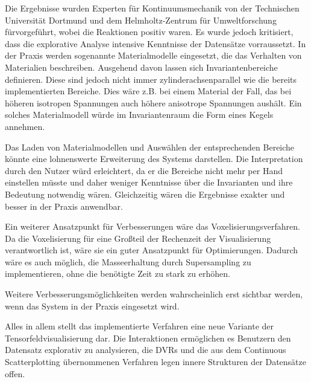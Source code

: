 \documentclass[a4paper,fontsize=12pt,toc=bib,halfparskip]{scrartcl}
\begin{document}
Die Ergebnisse wurden Experten f\"ur Kontinuumsmechanik von der Technischen Universit\"at Dortmund und dem Helmholtz-Zentrum f\"ur Umweltforschung f\"urvorgef\"uhrt, wobei die Reaktionen positiv waren. Es wurde jedoch kritisiert, dass die explorative Analyse intensive Kenntnisse der Datens\"atze vorraussetzt. In der Praxis werden sogenannte Materialmodelle eingesetzt, die das Verhalten von Materialien beschreiben. Ausgehend davon lassen sich Invariantenbereiche definieren. Diese sind jedoch nicht immer zylinderachsenparallel wie die bereits implementierten Bereiche. Dies w\"are z.B. bei einem Material der Fall, das bei h\"oheren isotropen Spannungen auch h\"ohere anisotrope Spannungen aush\"alt. Ein solches Materialmodell w\"urde im Invariantenraum die Form eines Kegels annehmen. 

Das Laden von Materialmodellen und Ausw\"ahlen der entsprechenden Bereiche k\"onnte eine lohnenswerte Erweiterung des Systems darstellen. Die Interpretation durch den Nutzer w\"urd erleichtert, da er die Bereiche nicht mehr per Hand einstellen m\"usste und daher weniger Kenntnisse \"uber die Invarianten und ihre Bedeutung notwendig w\"aren. Gleichzeitig w\"aren die Ergebnisse exakter und besser in der Praxis anwendbar. 

Ein weiterer Ansatzpunkt f\"ur Verbesserungen w\"are das Voxelisierungsverfahren. Da die Voxelisierung f\"ur eine Gro{\ss}teil der Rechenzeit der Visualisierung verantwortlich ist, w\"are sie ein guter Ansatzpunkt f\"ur Optimierungen. Dadurch w\"are es auch m\"oglich, die Masseerhaltung durch Supersampling zu implementieren, ohne die ben\"otigte Zeit zu stark zu erh\"ohen.
 
Weitere Verbesserungsm\"oglichkeiten werden wahrscheinlich erst sichtbar werden, wenn das System in der Praxis eingesetzt wird. 

Alles in allem stellt das implementierte Verfahren eine neue Variante der Tensorfeldvisualisierung dar. Die Interaktionen erm\"oglichen es Benutzern den Datensatz explorativ zu analysieren, die DVRs und die aus dem Continuous Scatterplotting \"ubernommenen Verfahren legen innere Strukturen der Datens\"atze offen.


\label{LastPageBeforeRefs}
\clearpage
{}

\printbibliography
\label{LastBibPage}
\end{document}
